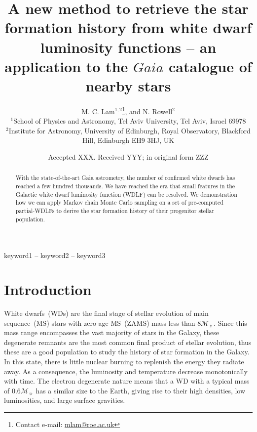 \documentclass[fleqn,usenatbib]{mnras}
\title[Galactic SFH from Gaia GCNS WDLF]{A new method to retrieve the star formation history from white dwarf luminosity functions -- an application to the $Gaia$ catalogue of nearby stars}
\author[M. C. Lam et al.]{
M. C. Lam$^{1, 2}$\thanks{Contact e-mail: \href{mailto:mlam@roe.ac.uk}{mlam@roe.ac.uk}},
and N. Rowell$^{2}$
\\
$^{1}$School of Physics and Astronomy, Tel Aviv University, Tel Aviv, Israel 69978\\
$^{2}$Institute for Astronomy, University of Edinburgh, Royal Observatory, Blackford Hill, Edinburgh EH9 3HJ, UK
}
\date{Accepted XXX. Received YYY; in original form ZZZ}
\newcommand{\msun}{\mathcal{M}_{\sun}}
\begin{document}
\label{firstpage}
\pagerange{\pageref{firstpage}--\pageref{lastpage}}
\maketitle


\begin{abstract}
With the state-of-the-art Gaia astrometry, the number of confirmed white dwarfs
has reached a few hundred thousands. We have reached the era that small features
in the Galactic white dwarf luminosity function (WDLF) can be resolved. We
demonstration how we can apply Markov chain Monte Carlo sampling on a set of
pre-computed partial-WDLFs to derive the star formation history of their progenitor
stellar population.

\end{abstract}

\begin{keywords}
keyword1 -- keyword2 -- keyword3
\end{keywords}



\section{Introduction}
White dwarfs~(WDs) are the final stage of stellar evolution of main
sequence~(MS) stars with zero-age MS~(ZAMS) mass less than $8\msun$. Since this
mass range encompasses the vast majority of stars in the Galaxy, these
degenerate remnants are the most common final product of stellar evolution,
thus these are a good population to study the history of star formation in the
Galaxy. In this state, there is little nuclear burning to replenish the energy
they radiate away. As a consequence, the luminosity and temperature decrease
monotonically with time. The electron degenerate nature means that a WD with a
typical mass of $0.6\mathcal{M}_{\sun}$ has a similar size to the Earth, giving
rise to their high densities, low luminosities, and large surface gravities.
\end{document}
